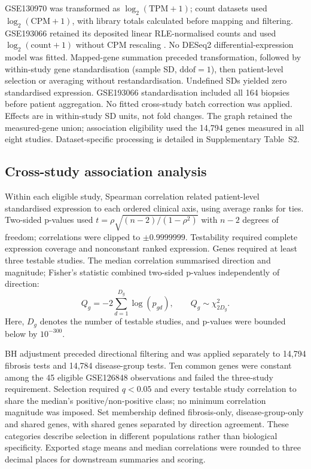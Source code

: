 \documentclass[11pt,a4paper]{article}
\begin{document}
GSE130970 was transformed as $\log_2(\mathrm{TPM}+1)$; count datasets used $\log_2(\mathrm{CPM}+1)$, with library totals calculated before mapping and filtering. GSE193066 retained its deposited linear RLE-normalised counts and used $\log_2(\mathrm{count}+1)$ without CPM rescaling \cite{ref9}. No DESeq2 differential-expression model was fitted. Mapped-gene summation preceded transformation, followed by within-study gene standardisation (sample SD, $\mathrm{ddof}=1$), then patient-level selection or averaging without restandardisation. Undefined SDs yielded zero standardised expression. GSE193066 standardisation included all 164 biopsies before patient aggregation. No fitted cross-study batch correction was applied. Effects are in within-study SD units, not fold changes. The graph retained the measured-gene union; association eligibility used the 14,794 genes measured in all eight studies. Dataset-specific processing is detailed in Supplementary Table~S2.

\subsection*{Cross-study association analysis}
Within each eligible study, Spearman correlation related patient-level standardised expression to each ordered clinical axis, using average ranks for ties. Two-sided p-values used $t=\rho\sqrt{(n-2)/(1-\rho^2)}$ with $n-2$ degrees of freedom; correlations were clipped to $\pm0.9999999$. Testability required complete expression coverage and nonconstant ranked expression. Genes required at least three testable studies. The median correlation summarised direction and magnitude; Fisher's statistic combined two-sided p-values independently of direction:
\[
Q_g=-2\sum_{d=1}^{D_g}\log(p_{gd}),\qquad Q_g\sim\chi^2_{2D_g}.
\]
Here, $D_g$ denotes the number of testable studies, and p-values were bounded below by $10^{-300}$.

BH adjustment \cite{ref11} preceded directional filtering and was applied separately to 14,794 fibrosis tests and 14,784 disease-group tests. Ten common genes were constant among the 45 eligible GSE126848 observations and failed the three-study requirement. Selection required $q<0.05$ and every testable study correlation to share the median's positive/non-positive class; no minimum correlation magnitude was imposed. Set membership defined fibrosis-only, disease-group-only and shared genes, with shared genes separated by direction agreement. These categories describe selection in different populations rather than biological specificity. Exported stage means and median correlations were rounded to three decimal places for downstream summaries and scoring.
\end{document}
